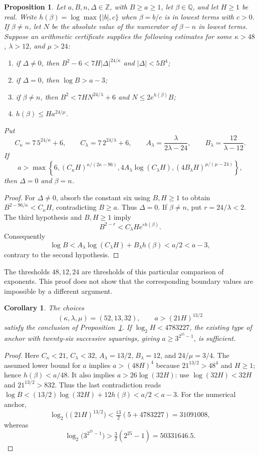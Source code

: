 \documentclass[11pt]{article}
\newtheorem{proposition}[theorem]{Proposition}
\newtheorem{corollary}[theorem]{Corollary}
\theoremstyle{definition}
\begin{document}
\begin{proposition}\label{prop:precision-thresholds}
Let $a,B,n,\Delta\in\mathbb Z$, with $B\ge a\ge1$, let
$\beta\in\mathbb Q$, and let $H\ge1$ be real.
Write $h(\beta)=\log\max\{|b|,c\}$ when $\beta=b/c$ is in lowest
terms with $c>0$. If $\beta\ne n$, let $N$ be the absolute value
of the numerator of $\beta-n$ in lowest terms.
Suppose an arithmetic certificate supplies the following estimates
for some $\kappa>48$,
$\lambda>12$, and $\mu>24$:
\begin{enumerate}
\item if $\Delta\ne0$, then
$B^2-6<7H|\Delta|^{24/\kappa}$ and $|\Delta|<5B^4$;
\item if $\Delta=0$, then $\log B>a-3$;
\item if $\beta\ne n$, then
$B^2<7HN^{24/\lambda}+6$ and $N\le2e^{h(\beta)}B$;
\item $h(\beta)\le H a^{24/\mu}$.
\end{enumerate}
Put
\[
 C_\kappa=7\,5^{24/\kappa}+6,\qquad
 C_\lambda=7\,2^{24/\lambda}+6,\qquad
 A_\lambda=\frac{\lambda}{2\lambda-24},\qquad
 B_\lambda=\frac{12}{\lambda-12}.
\]
If
\[
 a>\max\left\{6,
 (C_\kappa H)^{\kappa/(2\kappa-96)},
 4A_\lambda\log(C_\lambda H),
 (4B_\lambda H)^{\mu/(\mu-24)}\right\},
\]
then $\Delta=0$ and $\beta=n$.
\end{proposition}
\begin{proof}
For $\Delta\ne0$, absorb the constant six using $B,H\ge1$ to obtain
$B^{2-96/\kappa}<C_\kappa H$, contradicting $B\ge a$.
Thus $\Delta=0$. If $\beta\ne n$, put $r=24/\lambda<2$.
The third hypothesis and $B,H\ge1$ imply
\[
 B^{2-r}<C_\lambda H e^{r h(\beta)}.
\]
Consequently
\[
 \log B<A_\lambda\log(C_\lambda H)+B_\lambda h(\beta)<a/2<a-3,
\]
contrary to the second hypothesis.
\end{proof}

The thresholds $48,12,24$ are thresholds of this particular comparison
of exponents. This proof does not show that the corresponding boundary
values are impossible by a different argument.

\begin{corollary}\label{cor:scalar32}
The choices
\[
 (\kappa,\lambda,\mu)=(52,13,32),\qquad a>(21H)^{13/2}
\]
satisfy the conclusion of Proposition~\ref{prop:precision-thresholds}.
If $\log_2H<4783227$, the existing type of anchor with twenty-six
successive squarings, giving $a\ge3^{2^{25}-1}$, is sufficient.
\end{corollary}
\begin{proof}
Here $C_\kappa<21$, $C_\lambda<32$,
$A_\lambda=13/2$, $B_\lambda=12$, and $24/\mu=3/4$.
The assumed lower bound for $a$ implies $a>(48H)^4$ because
$21^{13/2}>48^4$ and $H\ge1$; hence $h(\beta)<a/48$.
It also implies $a>26\log(32H)$: use $\log(32H)<32H$ and
$21^{13/2}>832$. Thus the last contradiction reads
$\log B<(13/2)\log(32H)+12h(\beta)<a/2<a-3$.
For the numerical anchor,
\[
 \log_2\big((21H)^{13/2}\big)
 <\tfrac{13}{2}(5+4783227)=31091008,
\]
whereas
\[
 \log_2\big(3^{2^{25}-1}\big)
 >\tfrac32(2^{25}-1)=50331646.5.
\]
\end{proof}
\end{document}
